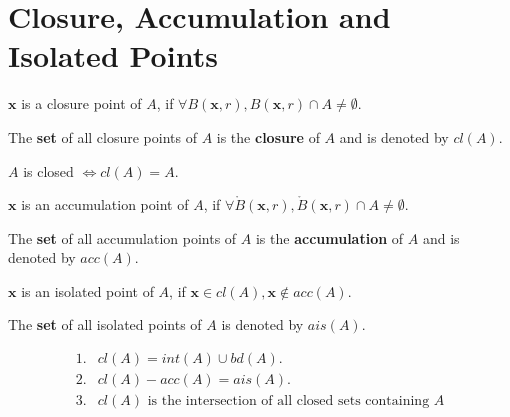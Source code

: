 \section{Closure, Accumulation and Isolated Points}

\begin{definition}
    $\mathbf{x}$ is a closure point of $A$, if $\forall B(\mathbf{x},r), B(\mathbf{x},r) \cap A \neq \emptyset$.

    The \textbf{set} of all closure points of $A$ is the \textbf{closure} of $A$ and is denoted by $cl(A)$.
\end{definition}

\begin{proposition}
    $A$ is closed $\iff cl(A)=A$.
\end{proposition}

\begin{definition}
    $\mathbf{x}$ is an accumulation point of $A$, if $\forall \mathring{B}(\mathbf{x},r), \mathring{B}(\mathbf{x},r) \cap A \neq \emptyset$.

    The \textbf{set} of all accumulation points of $A$ is the \textbf{accumulation} of $A$ and is denoted by $acc(A)$.
\end{definition}

\begin{definition}
    $\mathbf{x}$ is an isolated point of $A$, if $\mathbf{x} \in cl(A), \mathbf{x} \notin acc(A)$.

    The \textbf{set} of all isolated points of $A$ is denoted by $ais(A)$.
\end{definition}

\begin{remark*}
    \begin{align*}
        1. & cl(A) = int(A) \cup bd(A).                                         \\
        2. & cl(A) - acc(A) = ais(A).                                           \\
        3. & cl(A) \text{ is the intersection of all closed sets containing } A
    \end{align*}
\end{remark*}


